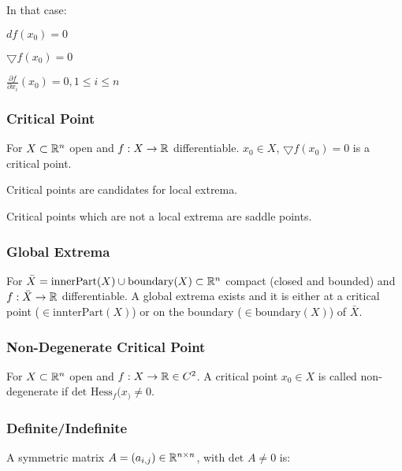 In that case:
\begin{inparaitem}
    \item  $df(x_0) = 0$
    \item $\bigtriangledown f(x_0) = 0$
    \item $\frac{\partial f}{\partial x_i}(x_0) = 0, 1 \le i \le n$
\end{inparaitem}

\subsubsection{Critical Point}
For $X \subset \mathbb{R}^n$ open and $f: X \to \mathbb{R}$ differentiable. $x_0 \in X$, $\bigtriangledown f(x_0) = 0$ is a critical point.

\begin{compactitem}
    \item Critical points are candidates for local extrema.
    \item Critical points which are not a local extrema are saddle points.
\end{compactitem}

\subsubsection{Global Extrema}
For $\bar{X} = \text{innerPart}(X) \cup \text{boundary}(X) \subset \mathbb{R}^n$ compact (closed and bounded) and $f: \bar{X} \to \mathbb{R}$ differentiable. A global extrema exists and it is either at a critical point ($\in \text{innterPart}(X)$) or on the boundary ($\in \text{boundary}(X)$) of $\bar{X}$.

\subsubsection{Non-Degenerate Critical Point} 
For $X \subset \mathbb{R}^n$ open and $f: X \to \mathbb{R} \in C^2$. A critical point $x_0 \in X$ is called non-degenerate if $\text{det }\text{Hess}_f(x_) \neq 0$.

\subsubsection{Definite/Indefinite}
A symmetric matrix $A = (a_{i,j}) \in \mathbb{R}^{n \times n}$, with $\text{det } A \neq 0$ is:


